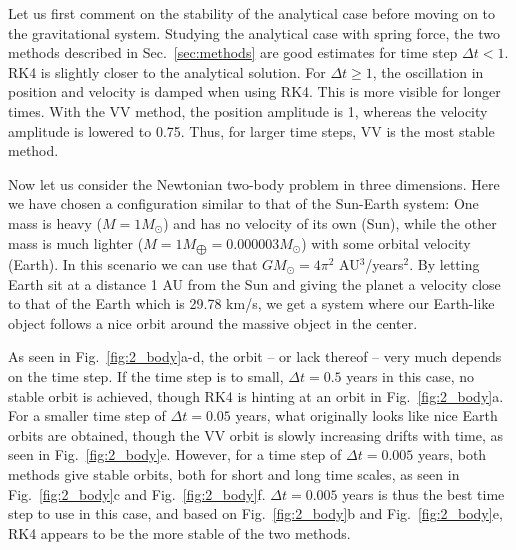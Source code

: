 \documentclass{article}
\begin{document}
\begin{multicols}{2}
Let us first comment on the stability of the analytical case before moving on to the gravitational system. Studying the analytical case with spring force, the two methods described in Sec.~\ref{sec:methods} are good estimates for time step $\Delta t<1$. RK4 is slightly closer to the analytical solution. For $\Delta t \geqslant 1$, the oscillation in position and velocity is damped when using RK4. This is more visible for longer times. With the VV method, the position amplitude is 1, whereas the velocity amplitude is lowered to 0.75. Thus, for larger time steps, VV is the most stable method.

Now let us consider the Newtonian two-body problem in three dimensions. Here we have chosen a configuration similar to that of the Sun-Earth system: One mass is heavy ($M = 1 M_{\odot}$) and has no velocity of its own (Sun), while the other mass is much lighter ($M = 1 M_{\bigoplus} = 0.000003 M_{\odot}$) with some orbital velocity (Earth). In this scenario we can use that $GM_{\odot} = 4\pi^2$ AU$^3$/years$^2$. By letting Earth sit at a distance 1 AU from the Sun and giving the planet a velocity close to that of the Earth which is 29.78 km/s, we get a system where our Earth-like object follows a nice orbit around the massive object in the center. 

As seen in Fig.~\ref{fig:2_body}a-d, the orbit -- or lack thereof -- very much depends on the time step. If the time step is to small, $\Delta t = 0.5$ years in this case, no stable orbit is achieved, though RK4 is hinting at an orbit in Fig.~\ref{fig:2_body}a. For a smaller time step of $\Delta t = 0.05$ years, what originally looks like nice Earth orbits are obtained, though the VV orbit is slowly increasing drifts with time, as seen in Fig.~\ref{fig:2_body}e. However, for a time step of $\Delta t = 0.005$ years, both methods give stable orbits, both for short and long time scales, as seen in Fig.~\ref{fig:2_body}c and Fig.~\ref{fig:2_body}f. $\Delta t = 0.005$ years is thus the best time step to use in this case, and based on Fig.~\ref{fig:2_body}b and Fig.~\ref{fig:2_body}e, RK4 appears to be the more stable of the two methods.


\end{multicols}
\end{document}
